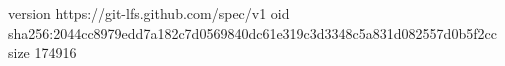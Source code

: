 version https://git-lfs.github.com/spec/v1
oid sha256:2044cc8979edd7a182c7d0569840dc61e319c3d3348c5a831d082557d0b5f2cc
size 174916
